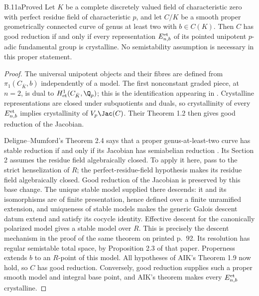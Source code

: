 \begin{claim}{B.11a}{Proved}
Let $K$ be a complete discretely valued field of characteristic zero with
perfect residue field of characteristic $p$, and let $C/K$ be a smooth
proper geometrically connected curve of genus at least two with $b\in C(K)$.
Then $C$ has good reduction if and only if every representation
$E^{\rm et}_{n,b}$ of its pointed unipotent $p$-adic fundamental group is
crystalline. No semistability assumption is necessary in this proper
statement.
\end{claim}
\begin{proof}
The universal unipotent objects and their fibres are defined from
$\pi_1(C_{\bar K},b)$ independently of a model. The first nonconstant
graded piece, at $n=2$, is dual to $H^1_{\rm et}(C_{\bar K},\Q_p)$;
this is the identification appearing in \citet[Theorem 1.7(ii)]{BC_AIK}.
Crystalline representations are closed under subquotients and duals, so
crystallinity of every $E^{\rm et}_{n,b}$ implies crystallinity of
$V_p\Jac(C)$. Their Theorem 1.2 then gives good reduction of the Jacobian.

Deligne--Mumford's Theorem 2.4 says that a proper genus-at-least-two curve
has stable reduction if and only if its Jacobian has semiabelian reduction
\citep[Theorem 2.4, printed p.~89]{BC_DM}. Its Section 2 assumes the residue
field algebraically closed. To apply it here, pass to the strict
henselization of $R$; the perfect-residue-field hypothesis makes its residue
field algebraically closed. Good reduction of the Jacobian is preserved
by this base change. The unique stable model supplied there descends:
it and its isomorphisms are of finite presentation, hence defined over a
finite unramified extension, and uniqueness of stable models makes the
generic Galois descent datum extend and satisfy its cocycle identity.
Effective descent for the canonically polarized model gives a stable model
over $R$. This is precisely the descent mechanism in the proof of the
same theorem on printed p.~92. Its resolution has regular semistable total
space, by Proposition 2.3 of that paper. Properness extends $b$ to an
$R$-point of this model. All hypotheses of AIK's Theorem 1.9 now hold, so
$C$ has good reduction. Conversely, good reduction supplies such a proper
smooth model and integral base point, and AIK's theorem makes every
$E^{\rm et}_{n,b}$ crystalline.
\end{proof}

